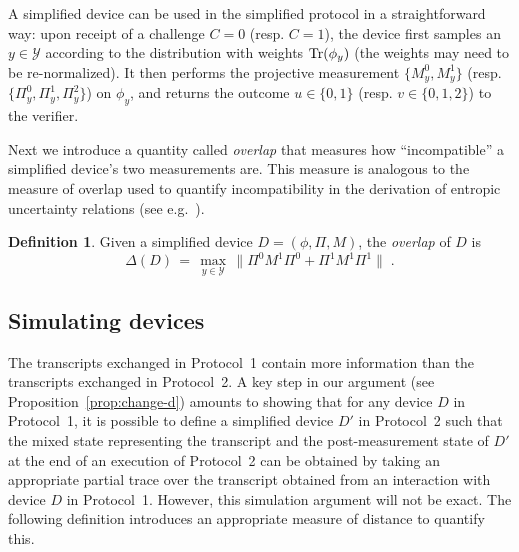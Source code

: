 \documentclass[11pt]{article}
\theoremstyle{remark}
\theoremstyle{definition}
\newtheorem{definition}[theorem]{Definition}
\newcommand{\Tr}{\mbox{\rm Tr}}
\newcommand{\mY}{\ensuremath{\mathcal{Y}}}
\begin{document}
A simplified device can be used in the simplified protocol in a straightforward way: upon receipt of a challenge $C=0$ (resp. $C=1$), the device first samples an $y\in\mY$ according to the distribution with weights $\Tr(\phi_y)$ (the weights may need to be re-normalized). It then performs the projective measurement $\{M_y^0,M_y^1\}$ (resp. $\{\Pi_y^0,\Pi_y^1,\Pi_y^2 \}$) on $\phi_y$, and returns the outcome $u\in\{0,1\}$ (resp. $v\in\{0,1,2\}$) to the verifier. 

Next we introduce a quantity called \emph{overlap} that measures how ``incompatible'' a simplified device's two measurements are. This measure is analogous to the measure of overlap used to quantify incompatibility in the derivation of entropic uncertainty relations (see e.g.~\cite{}). 

\begin{definition}\label{def:overlap}
Given a simplified device $D=(\phi,\Pi,M)$, the \emph{overlap} of $D$ is 
$$\Delta(D)\,=\,\max_{y\in\mY}\,\big\|\Pi^0 M^1 \Pi^0 + \Pi^1 M^1 \Pi^1 \big\|\;.$$
\end{definition}

\subsection{Simulating devices}
\label{sec:sim-dev}

The transcripts exchanged in Protocol~1 contain more information than the transcripts exchanged in Protocol~2. A key step in our argument (see Proposition~\ref{prop:change-d}) amounts to showing that for any device $D$ in Protocol~1, it is possible to define a simplified device $D'$ in Protocol~2 such that the mixed state representing the transcript and the post-measurement state of $D'$ at the end of an execution of Protocol~2 can be obtained by taking an appropriate partial trace over the transcript obtained from an interaction with device $D$ in Protocol~1. However, this simulation argument will not be exact. The following definition introduces an appropriate measure of distance to quantify this. 
\end{document}
